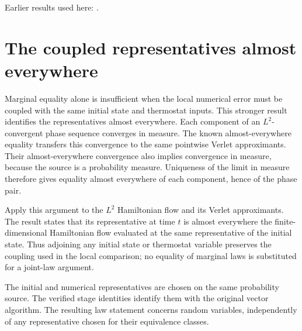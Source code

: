 \documentclass[11pt,a4paper]{article}
\begin{document}
Earlier results used here: \cite[Section~3.13.2]{LangevinLean2026ULASC}.

\section{\texorpdfstring{The coupled representatives almost everywhere}{The coupled representatives almost everywhere}}


Marginal equality alone is insufficient when the local numerical error must be coupled with the same initial state and thermostat inputs. This stronger result identifies the representatives almost everywhere. Each component of an \(L^{2}\)-convergent phase sequence converges in measure. The known almost-everywhere equality transfers this convergence to the same pointwise Verlet approximants. Their almost-everywhere convergence also implies convergence in measure, because the source is a probability measure. Uniqueness of the limit in measure therefore gives equality almost everywhere of each component, hence of the phase pair.



Apply this argument to the \(L^{2}\) Hamiltonian flow and its Verlet approximants. The result states that its representative at time \(t\) is almost everywhere the finite-dimensional Hamiltonian flow evaluated at the same representative of the initial state. Thus adjoining any initial state or thermostat variable preserves the coupling used in the local comparison; no equality of marginal laws is substituted for a joint-law argument.



The initial and numerical representatives are chosen on the same probability source. The verified stage identities identify them with the original vector algorithm. The resulting law statement concerns random variables, independently of any representative chosen for their equivalence classes.
\end{document}

